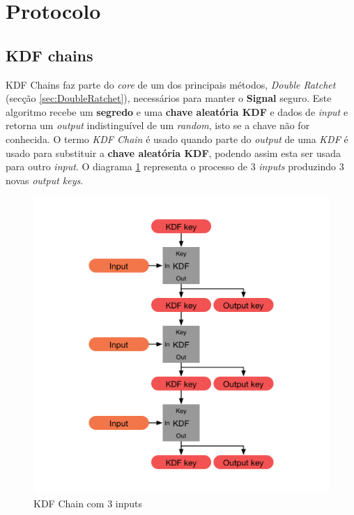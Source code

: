 \section{Protocolo}

\subsection{KDF chains}\label{sec:KDF}
KDF Chains faz parte do \emph{core} de um dos principais métodos, \emph{Double Ratchet} (secção \ref{sec:DoubleRatchet}), necessários para manter o \textbf{Signal} seguro.
Este algoritmo recebe um \textbf{segredo} e uma \textbf{chave aleatória KDF} e dados de \emph{input} e retorna um \emph{output} indistinguível de um \emph{random}, isto se a chave não for conhecida.
O termo \emph{KDF Chain} é usado quando parte do \emph{output} de uma \emph{KDF} é usado para substituir a \textbf{chave aleatória KDF}, podendo assim esta ser usada para outro \emph{input}. O diagrama \ref{diagram:kdfChain} representa o processo de 3 \emph{inputs} produzindo 3 novas \emph{output keys}.


\begin{figure}[H]
\begin{center}
\includegraphics[width=12cm]{img/kdfChain.png}
\caption{KDF Chain com 3 inputs}
\label{diagram:kdfChain}
\centering
\end{center}
\end{figure}

